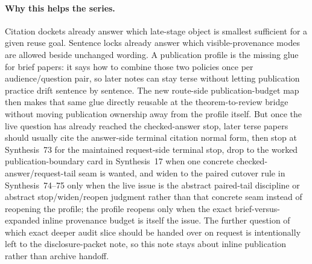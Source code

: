 \documentclass[11pt]{article}
\begin{document}
\paragraph{Why this helps the series.}
Citation dockets already answer which late-stage object is smallest sufficient for a given reuse goal.
Sentence locks already answer which visible-provenance modes are allowed beside unchanged wording.
A publication profile is the missing glue for brief papers: it says how to combine those two policies once per audience/question pair, so later notes can stay terse without letting publication practice drift sentence by sentence. The new route-side publication-budget map then makes that same glue directly reusable at the theorem-to-review bridge without moving publication ownership away from the profile itself.
But once the live question has already reached the checked-answer stop, later terse papers should usually cite the answer-side terminal citation normal form, then stop at Synthesis~73 for the maintained request-side terminal stop, drop to the worked publication-boundary card in Synthesis~17 when one concrete checked-answer/request-tail seam is wanted, and widen to the paired cutover rule in Synthesis~74--75 only when the live issue is the abstract paired-tail discipline or abstract stop/widen/reopen judgment rather than that concrete seam instead of reopening the profile; the profile reopens only when the exact brief-versus-expanded inline provenance budget is itself the issue.\cite{series:challengeanswerreviewmenus,series:workedexample,series:pairedterminalcitationdiscipline,series:pairedterminalcutoverrules}
The further question of which exact deeper audit slice should be handed over on request is intentionally left to the disclosure-packet note, so this note stays about inline publication rather than archive handoff.
\end{document}
